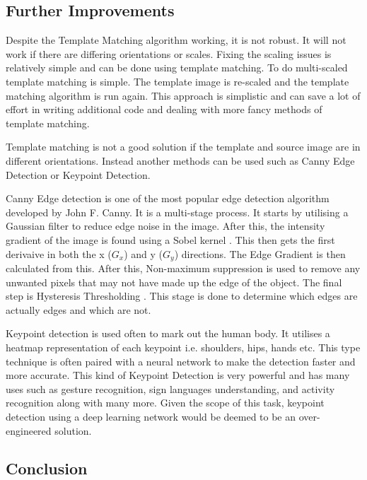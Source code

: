 \documentclass[conference]{IEEEtran}
\begin{document}
\subsection{Further Improvements}

Despite the Template Matching algorithm working, it is not robust. It will not work if there are differing orientations or scales. Fixing the scaling issues is relatively simple and can be done using template matching. To do multi-scaled template matching is simple. The template image is re-scaled and the template matching algorithm is run again. \cite{ref:open_cv_templae_matching_scaling} This approach is simplistic and can save a lot of effort in writing additional code and dealing with more fancy methods of template matching. 

Template matching is not a good solution if the template and source image are in different orientations. Instead another methods can be used such as Canny Edge Detection or Keypoint Detection. 

Canny Edge detection is one of the most popular edge detection algorithm developed by John F. Canny. It is a multi-stage process. It starts by utilising a Gaussian filter \cite{ref:Gaussian_filters} to reduce edge noise in the image. After this, the intensity gradient of the image is found using a Sobel kernel \cite{ref:sobel_kernal}. This then gets the first derivaive in both the x ($G_x$) and y ($G_y$) directions. The Edge Gradient is then calculated from this.  After this, Non-maximum suppression \cite{ref:non-maximum_supression} is used to remove any unwanted pixels that may not have made up the edge of the object. The final step is Hysteresis Thresholding \cite{ref:hysteresis_thresholding}. This stage is done to determine which edges are actually edges and which are not. 

Keypoint detection is used often to mark out the human body. It utilises a heatmap representation of each keypoint i.e. shoulders, hips, hands etc. \cite{ref:keypoint_detection} This type technique is often paired with a neural network to make the detection faster and more accurate. This kind of Keypoint Detection is very powerful and has many uses such as gesture recognition, sign languages understanding, and activity recognition along with many more. \cite{ref:keypoint_detection_using_deep_learning} Given the scope of this task, keypoint detection using a deep learning network would be deemed to be an over-engineered solution.

\subsection{Conclusion}
\end{document}
